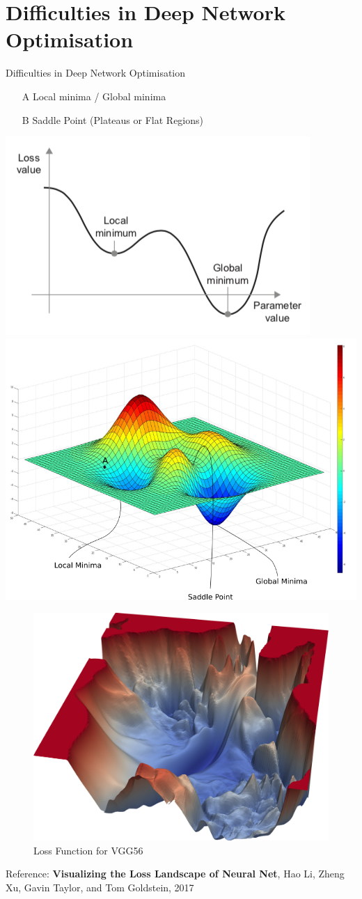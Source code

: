 \documentclass[xcolor=pdftex,dvipsnames,table,mathserif]{beamer}
\begin{document}
\section{Difficulties in Deep Network Optimisation}

\begin{frame}{Difficulties in Deep Network Optimisation}
\begin{itemize}
\item[A]{Local minima / Global minima}
\item[B]{Saddle Point (Plateaus or Flat Regions)}
\end{itemize}
\includegraphics[width=.45\columnwidth]{../graphics/LocalGlobalMinimum}
\includegraphics[width=.45\columnwidth]{../graphics/challenges1}
\end{frame}

\begin{frame}
\begin{figure}
\includegraphics[width=.5\columnwidth]{../graphics/VGG56Loss}
\caption{Loss Function for VGG56}
\end{figure}
Reference: \textbf{Visualizing the Loss Landscape of Neural Net}, Hao Li, Zheng Xu, Gavin Taylor, and Tom Goldstein, 2017
\end{frame}
\end{document}
